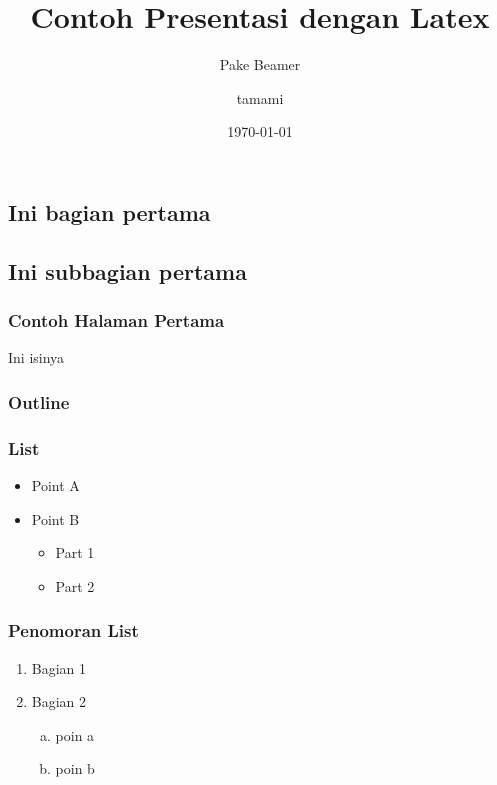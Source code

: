 \documentclass[handout]{beamer}
\title{Contoh Presentasi dengan Latex}
\subtitle{Pake Beamer}
\author{tamami}
\institute{BPPKAD Kab. Brebes}
\date{\today}
\begin{document}

\begin{frame}
\titlepage
\end{frame}



\begin{frame}
\section{Ini bagian pertama}
\subsection{Ini subbagian pertama}
\end{frame}


\begin{frame}
\frametitle{Contoh Halaman Pertama}
Ini isinya
\end{frame}



\begin{frame}
\frametitle{Outline}
\tableofcontents
\end{frame}



\begin{frame}
\frametitle{List}
\begin{itemize}
	\item Point A
	\item Point B
	\begin{itemize}
		\item Part 1
		\item Part 2
	\end{itemize}
\end{itemize}
\end{frame}



\begin{frame}
\frametitle{Penomoran List}
\begin{enumerate}
	\item Bagian 1
	\item Bagian 2
	\begin{enumerate}[a.]
		\item poin a
		\item poin b
	\end{enumerate}
\end{enumerate}
\end{frame}
\end{document}
